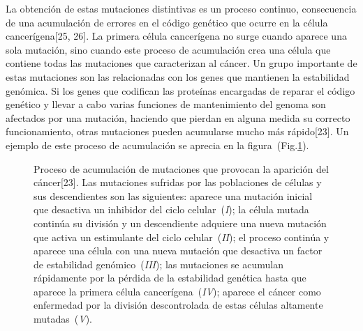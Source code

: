 \hspace{.1cm}La obtención de estas mutaciones distintivas es un proceso continuo, consecuencia de una acumulación de errores en el código genético que ocurre en la célula cancerígena[25, 26]. La primera célula cancerígena no surge cuando aparece una sola mutación, sino cuando este proceso de acumulación crea una célula que contiene todas las mutaciones que caracterizan al cáncer. Un grupo importante de estas mutaciones son las relacionadas con los genes que mantienen la estabilidad genómica. Si los genes que codifican las proteínas encargadas de reparar el código genético y llevar a cabo varias funciones de mantenimiento del genoma son afectados por una mutación, haciendo que pierdan en alguna medida su correcto funcionamiento, otras mutaciones pueden acumularse mucho más rápido[23]. Un ejemplo de este proceso de acumulación se aprecia en la figura~(Fig.\ref{fig-evolution}).

\begin{figure}[!ht]
\begin{center}
\end{center}\vspace*{-0.6cm}
\caption[Proceso de acumulaci\'on de mutaciones que provocan la aparici\'on del c\'ancer]{Proceso de acumulaci\'on de mutaciones que provocan la aparici\'on del c\'ancer[23]. Las mutaciones sufridas por las poblaciones de c\'elulas y sus descendientes son las siguientes: aparece una mutaci\'on inicial que desactiva un inhibidor del ciclo celular~(\emph{I}); la c\'elula mutada contin\'ua su divisi\'on y un descendiente adquiere una nueva mutaci\'on que activa un estimulante del ciclo celular~(\emph{II}); el proceso contin\'ua y aparece una c\'elula con una nueva mutaci\'on que desactiva un factor de estabilidad gen\'omico~(\emph{III}); las mutaciones se acumulan r\'apidamente por la p\'erdida de la estabilidad gen\'etica hasta que aparece la primera c\'elula cancer\'igena~(\emph{IV}); aparece el c\'ancer como enfermedad por la divisi\'on descontrolada de estas c\'elulas altamente mutadas~(\emph{V}).}
\label{fig-evolution}
\end{figure}

